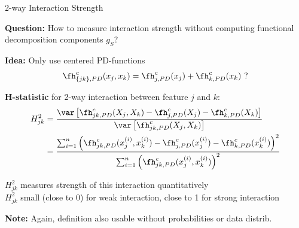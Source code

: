 \documentclass[10pt,compress,t,notes=noshow, xcolor=table]{beamer}
\begin{document}
\begin{framei}[align=top]{2-way Interaction Strength}
\item<+-> \textbf{Question:} How to measure interaction strength without computing functional decomposition components $g_S$?
\item<+-> \textbf{Idea:} Only use centered PD-functions
$$
\fh_{\{jk\}, PD}^c(x_j, x_k)
= \fh^c_{j, PD}(x_j) + \fh^c_{k, PD}(x_k) \text{ ?}
$$
\item<+-> \textbf{H-statistic} for 2-way interaction between feature $j$ and $k$:
\begin{align*}
H^2_{jk}
& = \frac{
\var \left[ \fh^c_{jk,PD}(X_j, X_k) - \fh^c_{j, PD}(X_j) - \fh^c_{k, PD}(X_k) \right]
}{\var \left[ \fh^c_{jk,PD}(X_j, X_k) \right]} \\
& = \frac{
\sum_{i=1}^n \left( \fh^c_{jk,PD}(x_j^{(i)}, x_k^{(i)})
- \fh^c_{j, PD}(x_j^{(i)}) - \fh^c_{k, PD}(x_k^{(i)}) \right)^2
}{
\sum_{i=1}^n \left( \fh^c_{jk,PD}(x_j^{(i)}, x_k^{(i)}) \right)^2
}
\end{align*}
\item<+->[$\Rightarrow$]
$H^2_{jk}$ measures strength of this interaction quantitatively \\
$H^2_{jk}$ small (close to 0) for weak interaction, close to 1 for strong interaction
\item<+-> \textbf{Note:} Again, definition also usable without probabilities or data distrib.
\end{framei}
\end{document}
